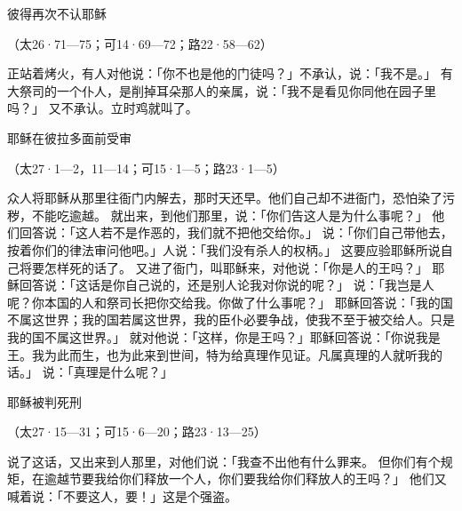 {\par }{\SH 彼得再次不认耶稣
\par }{\R （太26·71—75；可14·69—72；路22·58—62）
\par }{\PP {}正站着烤火，有人对他说：「你不也是他的门徒吗？」{}不承认，说：「我不是。」
有大祭司的一个仆人，是{}削掉耳朵那人的亲属，说：「我不是看见你同他在园子里吗？」
又不承认。立时鸡就叫了。
\par }{\SH 耶稣在彼拉多面前受审
\par }{\R （太27·1—2，11—14；可15·1—5；路23·1—5）
\par }{\PP {}众人将耶稣从{}那里往衙门内解去，那时天还早。他们自己却不进衙门，恐怕染了污秽，不能吃逾越{}。
就出来，到他们那里，说：「你们告这人是为什么事呢？」
他们回答说：「这人若不是作恶的，我们就不把他交给你。」
说：「你们自己带他去，按着你们的律法审问他吧。」{}人说：「我们没有杀人的权柄。」
这要应验耶稣所说自己将要怎样死的话了。
又进了衙门，叫耶稣来，对他说：「你是{}人的王吗？」
耶稣回答说：「这话是你自己说的，还是别人论我对你说的呢？」
说：「我岂是{}人呢？你本国的人和祭司长把你交给我。你做了什么事呢？」
耶稣回答说：「我的国不属这世界；我的国若属这世界，我的臣仆必要争战，使我不至于被交给{}人。只是我的国不属这世界。」
就对他说：「这样，你是王吗？」耶稣回答说：「你说我是王。我为此而生，也为此来到世间，特为给真理作见证。凡属真理的人就听我的话。」
说：「真理是什么呢？」
\par }{\SH 耶稣被判死刑
\par }{\R （太27·15—31；可15·6—20；路23·13—25）
\par }{\PP 说了这话，又出来到{}人那里，对他们说：「我查不出他有什么罪来。
但你们有个规矩，在逾越节要我给你们释放一个人，你们要我给你们释放{}人的王吗？」
他们又喊着说：「不要这人，要{}！」这{}是个强盗。

}
